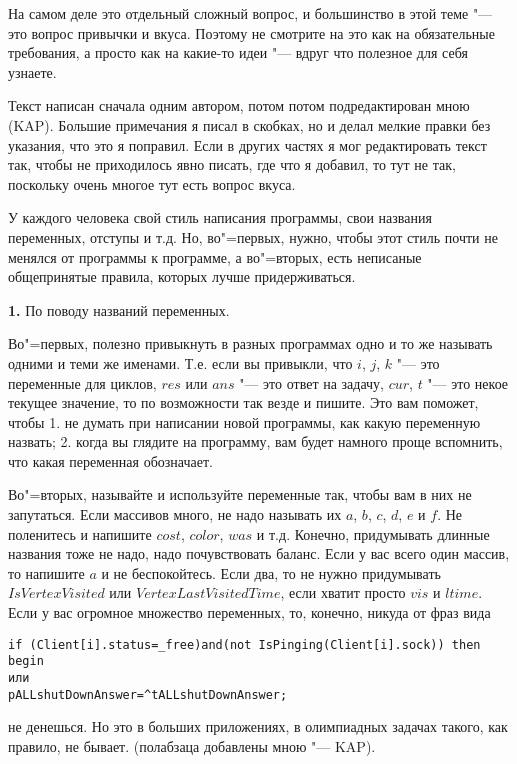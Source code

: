 На самом деле это отдельный сложный вопрос, и большинство в этой теме "--- это вопрос привычки и вкуса. Поэтому не смотрите на это как на обязательные требования, а просто как на какие-то идеи "--- вдруг что полезное для себя узнаете.

Текст написан сначала одним автором, потом потом подредактирован мною (KAP). Большие примечания я писал в скобках, 
но и делал мелкие правки без указания, что это я поправил. Если в других частях я мог 
редактировать текст так, чтобы не приходилось явно писать, где что я добавил, то тут не так, 
поскольку очень многое тут есть вопрос вкуса. 

У каждого человека свой стиль написания программы, свои названия переменных, отступы и т.д. Но, во"=первых, 
нужно, чтобы этот стиль почти не менялся от программы к программе, а во"=вторых, есть неписаные общепринятые 
правила, которых лучше придерживаться. 

\textbf{1.} По поводу названий переменных.

 Во"=первых, полезно привыкнуть в разных программах одно и 
то же называть одними и теми же 
именами. Т.е. если вы привыкли, что $i$, $j$, $k$ "--- это переменные для циклов, $res$ или $ans$ "--- это ответ на задачу,
$cur$, $t$ "--- это некое текущее значение, то по возможности так везде и пишите. Это вам поможет, 
чтобы 1. не думать при написании новой программы, как какую переменную назвать; 2. когда вы глядите на 
программу, вам будет намного проще вспомнить, что какая переменная обозначает.

Во"=вторых, называйте и используйте переменные так, чтобы вам в них не запутаться. Если массивов 
много, не надо называть их $a$, $b$, $c$, $d$, $e$ и $f$. Не  
поленитесь и напишите $cost$, $color$, $was$ и т.д. Конечно, придумывать длинные названия тоже не 
надо, надо почувствовать баланс. Если у вас всего один массив, то напишите $a$ и не беспокойтесь. 
Если два, то не нужно придумывать $IsVertexVisited$ или $VertexLastVisitedTime$, если хватит просто 
$vis$ и $ltime$. Если у вас огромное множество переменных, то, конечно, никуда от фраз вида
\begin{codesampleo}\begin{verbatim}
if (Client[i].status=_free)and(not IsPinging(Client[i].sock)) then begin
или
pALLshutDownAnswer=^tALLshutDownAnswer;
\end{verbatim}
\end{codesampleo}
\noindent не денешься. Но это в больших приложениях, в олимпиадных задачах такого, как правило, не бывает. (полабзаца 
добавлены мною "--- KAP).

